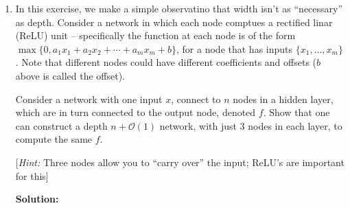 \documentclass[12pt]{article}
\newcommand{\BigO}[1]{\mathcal{O}\left( #1 \right)}
\begin{document}
\begin{enumerate}
\begin{enumerate}
   {\bf Solution:}

\item Prove that there is a ReLU network with one input variable $x$, $2k + \BigO{1}$ layers, all coefficients and thresholds being constants, that computes a function that has $2^{k}$ ``peaks'' in the interval $[0,1]$.

[The function above can be shown to be impossible to approximate using a small depth ReLU network, without an exponential blow-up in the width.]

   {\bf Solution:}

\end{enumerate}

\item In this exercise, we make a simple observatino that width isn't as ``necessary'' as depth. Consider a network in which each node comptues a rectified linar (ReLU) unit -- specifically the function at each node is of the form $\max \{0, a_{1}x_{1} + a_{2}x_{2} + \cdots + a_{m}x_{m} + b\}$, for a node that has inputs $\{ x_{1}, \ldots, x_{m}\}$. Note that different nodes could have different coefficients and offsets ($b$ above is called the offset).

Consider a network with one input $x$, connect to $n$ nodes in a hidden layer, which are in turn connected to the output node, denoted $f$. Show that one can construct a depth $n + \BigO{1}$ network, with just 3 nodes in each layer, to compute the same $f$.

[{\em Hint:} Three nodes allow you to ``carry over'' the input; ReLU's are important for this]

   {\bf Solution:}
\end{enumerate}
 
\end{document}
